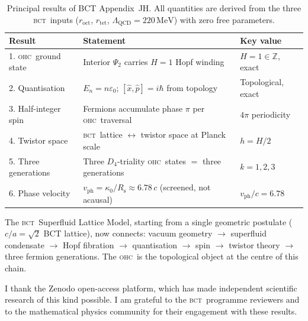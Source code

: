 \documentclass[aps,prl,preprint,superscriptaddress,floatfix]{revtex4-2}
\newcommand{\roct}{r_{\mathrm{oct}}}
\newcommand{\rtet}{r_{\mathrm{tet}}}
\newcommand{\LQCD}{\Lambda_{\mathrm{QCD}}}
\newcommand{\BCT}{\textsc{bct}}
\newcommand{\OHC}{\textsc{ohc}}
\newcommand{\Psiint}{\Psi_2}
\newcommand{\Rsph}{R_{\mathrm{s}}}
\newcommand{\kz}{\kappa_0}
\newcommand{\HopfN}{H}
\newcommand{\vph}{v_{\mathrm{ph}}}
\begin{document}
\begin{table}[h]
\centering
\caption{Principal results of BCT Appendix~JH.
All quantities are derived from the three \BCT\ inputs
($\roct$, $\rtet$, $\LQCD=220\,\mathrm{MeV}$) with zero free parameters.}
\label{tab:results}
\begin{tabular}{lll}
\toprule
\textbf{Result} & \textbf{Statement} & \textbf{Key value} \\
\midrule
1. \OHC\ ground state
  & Interior $\Psiint$ carries $\HopfN=1$ Hopf winding
  & $\HopfN = 1 \in \mathbb{Z}$, exact \\
2. Quantisation
  & $E_n = n\varepsilon_0$; $[\hat{x},\hat{p}]=i\hbar$ from topology
  & Topological, exact \\
3. Half-integer spin
  & Fermions accumulate phase $\pi$ per \OHC\ traversal
  & $4\pi$ periodicity \\
4. Twistor space
  & \BCT\ lattice $\leftrightarrow$ twistor space at Planck scale
  & $h = \HopfN/2$ \\
5. Three generations
  & Three $D_4$-triality \OHC\ states $= $ three generations
  & $k = 1,2,3$ \\
6. Phase velocity
  & $\vph = \kz/\Rsph \approx 6.78\,c$ (screened, not acausal)
  & $\vph/c = 6.78$ \\
\bottomrule
\end{tabular}
\end{table}

The \BCT\ Superfluid Lattice Model, starting from a single geometric
postulate ($c/a=\sqrt{2}$ BCT lattice), now connects:
vacuum geometry $\to$ superfluid condensate $\to$ Hopf fibration $\to$
quantisation $\to$ spin $\to$ twistor theory $\to$ three fermion
generations.
The \OHC\ is the topological object at the centre of this chain.

\begin{acknowledgments}
I thank the Zenodo open-access platform, which has made independent
scientific research of this kind possible.
I am grateful to the \BCT\ programme reviewers and to the
mathematical physics community for their engagement with these results.
\end{acknowledgments}
\end{document}
